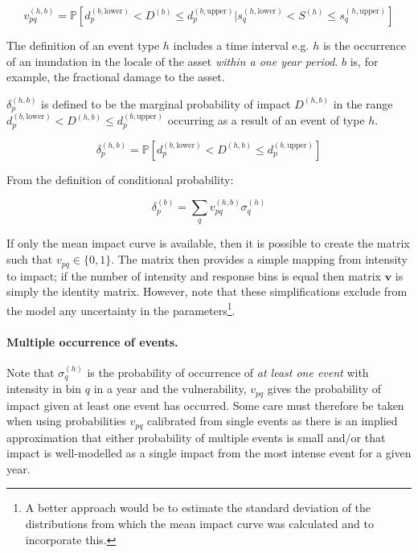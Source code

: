 \documentclass[a4paper,11pt]{extarticle} %
\begin{document}
\begin{equation}
    \label{Eq:vulnerability}
    v^{(h, b)}_{pq} = \mathbb{P} \left[ d^{(b,\text{lower})}_p < D^{(b)} \le d^{(b,\text{upper})}_p | s^{(h, \text{lower})}_q < S^{(h)} \le s^{(h, \text{upper})}_q \right]
\end{equation}

The definition of an event type $h$ includes a time interval e.g. $h$ is the occurrence of an inundation in the locale of the asset {\it within a one year period}. $b$ is, for example, the fractional damage to the asset.

$\delta^{(h,b)}_p$ is defined to be the marginal probability of impact $D^{(h, b)}$ in the range $d^{(b, \text{lower})}_p < D^{(h, b)} \le d^{(b,\text{upper})}_p$ occurring as a result of an event of type $h$.

\begin{equation}
    \label{Eq:impact}
    \delta^{(h, b)}_p =  \mathbb{P} \left[ d^{(b,\text{lower})}_p < D^{(h, b)} \le d^{(b,\text{upper})}_p \right]
\end{equation}

From the definition of conditional probability:

\begin{equation}
    \label{Eq:model}
    \delta^{(b)}_p = \sum_{q} v^{(h,b)}_{pq} \sigma^{(h)}_q
\end{equation}

If only the mean impact curve is available, then it is possible to create the matrix such that $v_{pq} \in \{0, 1\}$. The matrix then provides a simple mapping from intensity to impact; if the number of intensity and response bins is equal then matrix $\mathbf{v}$ is simply the identity matrix. However, note that these simplifications exclude from the model any uncertainty in the parameters\footnote{A better approach would be to estimate the standard deviation of the distributions from which the mean impact curve was calculated and to incorporate this.}.

\paragraph{Multiple occurrence of events.} Note that $\sigma^{(h)}_q$ is the probability of occurrence of \emph{at least one event} with intensity in bin $q$ in a year and the vulnerability, $v_{pq}$ gives the probability of impact given at least one event has occurred. Some care must therefore be taken when using probabilities $v_{pq}$ calibrated from single events as there is an implied approximation that either probability of multiple events is small and/or that impact is well-modelled as a single impact from the most intense event for a given year. 
\end{document}

